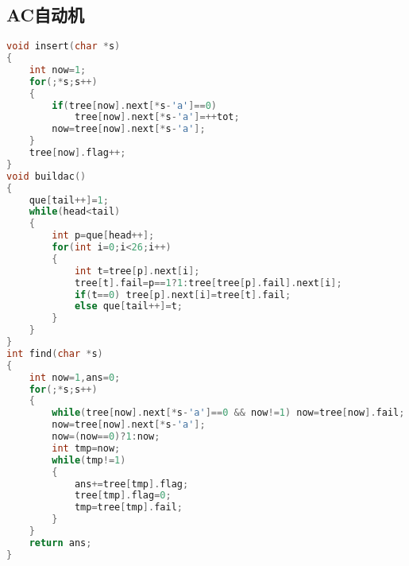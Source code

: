 \subsection{AC自动机}
    \begin{lstlisting}[language=c++]
void insert(char *s)
{
	int now=1;
	for(;*s;s++)
	{
		if(tree[now].next[*s-'a']==0) 
			tree[now].next[*s-'a']=++tot;
		now=tree[now].next[*s-'a'];	
	}	
	tree[now].flag++;
}
void buildac()
{
	que[tail++]=1;
	while(head<tail)
	{
		int p=que[head++];
		for(int i=0;i<26;i++)
		{
			int t=tree[p].next[i];
			tree[t].fail=p==1?1:tree[tree[p].fail].next[i];
			if(t==0) tree[p].next[i]=tree[t].fail;
			else que[tail++]=t;	
		}	
	}	
}
int find(char *s)
{
	int now=1,ans=0;
	for(;*s;s++)
	{
		while(tree[now].next[*s-'a']==0 && now!=1) now=tree[now].fail;
		now=tree[now].next[*s-'a'];
		now=(now==0)?1:now;
		int tmp=now;
		while(tmp!=1)
		{
			ans+=tree[tmp].flag;
			tree[tmp].flag=0;
			tmp=tree[tmp].fail;
		}	
	}	
	return ans;
}
    \end{lstlisting}
